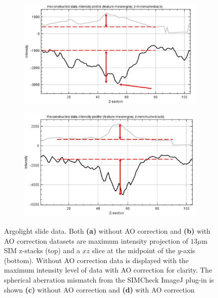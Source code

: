 \begin{figure}
	
	\begin{subfigure}[t]{0.45\textwidth}
		\centering
		\includegraphics[width=\linewidth]{images/Argolight_spherical_mismatch_woAO.jpg}
		\caption{}
		\label{fig:Argolight_spherical_mismatch_woAO}
	\end{subfigure}
	\begin{subfigure}[t]{0.45\textwidth}
		\centering
		\includegraphics[width=\linewidth]{images/Argolight_spherical_mismatch_AO.jpg}
		\caption{}
		\label{fig:Argolight_spherical_mismatch_AO}
	\end{subfigure}
	\caption[Argolight slide data]{Argolight slide data. Both \textbf{(a)} without AO correction and \textbf{(b)} with AO correction datasets 
		are maximum intensity projection of $13\mu$m SIM z-stacks (top) and 
		a $xz$ slice at the midpoint of the $y$-axis (bottom). Without AO correction data is displayed with the maximum intensity level of data with AO correction for clarity. The spherical aberration mismatch from the SIMCheck ImageJ plug-in\cite{ball2015simcheck} is shown \textbf{(c)} without AO correction and \textbf{(d)} with AO correction}
	\label{fig:Argolight_slide_both}
\end{figure}

